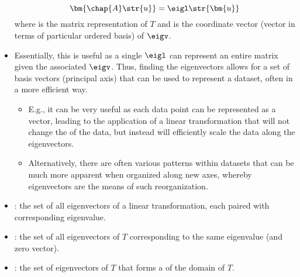 \begin{itemize}
  \[%
  \bm{\chap{A}\str{u}} = \eigl \str{\bm{u}}
  \]%
  where  is the matrix representation of \(T\) and  is the coordinate vector (vector in terms of particular ordered basis) of \(\eigv \).
  \item Essentially, this is useful as a single  \(\eigl \) can represent an entire matrix  given the associated  \(\eigv \). Thus, finding the eigenvectors allows for a set of basis vectors (principal axis) that can be used to represent a dataset, often in a more efficient way.
    \begin{itemize}
      \item E.g., it can be very useful as each data point can be represented as a vector, leading to the application of a linear transformation that will not change the \hyperref[Span]{} of the data, but instead will efficiently scale the data along the eigenvectors.
      \item Alternatively, there are often various patterns within datasets that can be much more apparent when organized along new axes, whereby eigenvectors are the means of such reorganization.
    \end{itemize}
  \item {}: the set of all eigenvectors of a linear transformation, each paired with corresponding eigenvalue.
  \item {}: the set of all eigenvectors of \(T\) corresponding to the same eigenvalue (and zero vector). 
  \item {}: the set of eigenvectors of \(T\) that forms a \hyperref[Basis]{} of the domain of \(T\).
  


\end{itemize}

